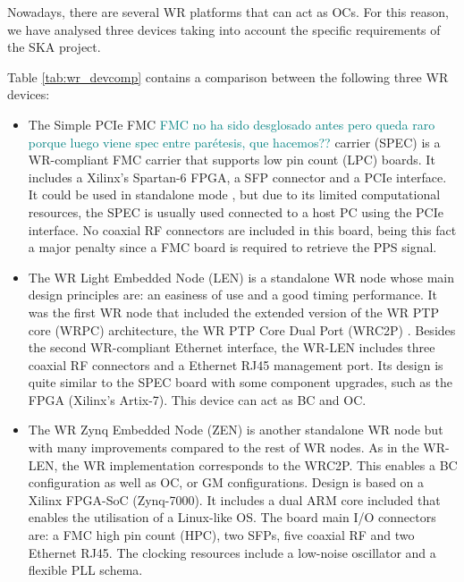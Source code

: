 Nowadays, there  are several WR platforms that can act as OCs. 
For this reason, we have analysed three devices taking into account the specific requirements of the SKA project.

Table \ref{tab:wr_devcomp} contains a comparison between the following three WR
devices: \begin{itemize} \item The Simple PCIe FMC \textcolor{teal}{FMC no ha 
sido desglosado antes pero queda raro porque luego viene spec entre parétesis, 
que hacemos??} carrier (SPEC)
			\cite{ohwr:spec} is a WR-compliant FMC carrier that
			supports low pin count (LPC) boards. It includes a
			Xilinx's Spartan-6 FPGA, a SFP connector and a PCIe
			interface. It could be used in standalone mode
			\cite{migueljl-paper-wr-spec}, but due to its limited
			computational resources, the SPEC is usually used
			connected to a host PC using the PCIe interface.  No
			coaxial RF connectors are included in this board, being this fact
			a major penalty since a FMC board is required to retrieve the PPS signal.
	
	\item The WR Light Embedded Node (LEN) \cite{sevensols:wr_len} is a
		standalone WR node whose main design principles are: an easiness
		of use and a good timing performance. It was the first WR node
		that included the extended version of the WR PTP core (WRPC)
		architecture, the WR PTP Core Dual Port (WRC2P)
		\cite{torres2016scalability}. Besides the second WR-compliant
		Ethernet interface, the WR-LEN includes three coaxial RF
		connectors and a Ethernet RJ45 management port. Its design is
		quite similar to the SPEC board with some component
		upgrades, such as the FPGA (Xilinx's Artix-7). This device can act as BC and OC.
	
	\item The WR Zynq Embedded Node (ZEN) \cite{sevensols:wr_zen} is another
		standalone WR node but with many improvements compared to the
		rest of WR nodes. As in the WR-LEN, the WR implementation
		corresponds to the WRC2P.  This enables a BC configuration as
		well as OC, or GM configurations. Design is based on a Xilinx FPGA-SoC
		(Zynq-7000). It includes a dual ARM core included that enables the utilisation of a Linux-like
		OS. The board main I/O connectors are: a FMC high pin count
		(HPC), two SFPs, five coaxial RF and two Ethernet RJ45. The
		clocking resources include a low-noise oscillator and a flexible PLL schema.
\end{itemize}

